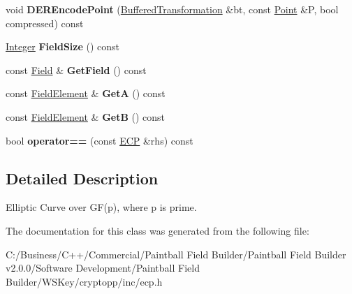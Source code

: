 \begin{DoxyCompactItemize}
\item 
\hypertarget{class_e_c_p_a0b81bbff3bb7c1b8e0606155a5f61370}{
void {\bfseries DEREncodePoint} (\hyperlink{class_buffered_transformation}{BufferedTransformation} \&bt, const \hyperlink{struct_e_c_p_point}{Point} \&P, bool compressed) const }
\label{class_e_c_p_a0b81bbff3bb7c1b8e0606155a5f61370}

\item 
\hypertarget{class_e_c_p_abca5b0e2a23be9c6c4fb41052680ea50}{
\hyperlink{class_integer}{Integer} {\bfseries FieldSize} () const }
\label{class_e_c_p_abca5b0e2a23be9c6c4fb41052680ea50}

\item 
\hypertarget{class_e_c_p_a83c5a9f0cf8b82771d5aa01402863738}{
const \hyperlink{class_modular_arithmetic}{Field} \& {\bfseries GetField} () const }
\label{class_e_c_p_a83c5a9f0cf8b82771d5aa01402863738}

\item 
\hypertarget{class_e_c_p_a82177287f9bb1ade023fc6735dbf5922}{
const \hyperlink{class_integer}{FieldElement} \& {\bfseries GetA} () const }
\label{class_e_c_p_a82177287f9bb1ade023fc6735dbf5922}

\item 
\hypertarget{class_e_c_p_aa8610d58c3dd14ce206cb3d79cd79706}{
const \hyperlink{class_integer}{FieldElement} \& {\bfseries GetB} () const }
\label{class_e_c_p_aa8610d58c3dd14ce206cb3d79cd79706}

\item 
\hypertarget{class_e_c_p_af65e0e7074c9127a7dddc120ee1baa10}{
bool {\bfseries operator==} (const \hyperlink{class_e_c_p}{ECP} \&rhs) const }
\label{class_e_c_p_af65e0e7074c9127a7dddc120ee1baa10}

\end{DoxyCompactItemize}


\subsection{Detailed Description}
Elliptic Curve over GF(p), where p is prime. 

The documentation for this class was generated from the following file:\begin{DoxyCompactItemize}
\item 
C:/Business/C++/Commercial/Paintball Field Builder/Paintball Field Builder v2.0.0/Software Development/Paintball Field Builder/WSKey/cryptopp/inc/ecp.h\end{DoxyCompactItemize}
